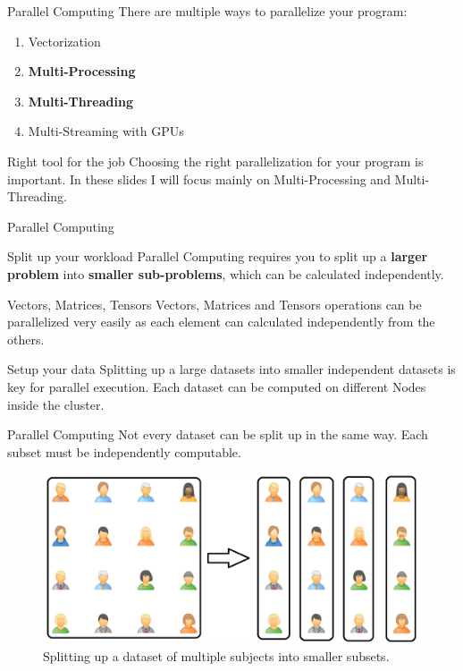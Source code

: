 \documentclass{beamer}
\begin{document}
\begin{frame}{Parallel Computing}
	There are multiple ways to parallelize your program:	
	\begin{enumerate}
		\item Vectorization
		\item \textbf{Multi-Processing}
		\item \textbf{Multi-Threading}
		\item Multi-Streaming with GPUs
	\end{enumerate}
	\begin{block}{Right tool for the job}
			Choosing the right parallelization for your program is important.  In these slides I will focus mainly on Multi-Processing and Multi-Threading.
	\end{block}

\end{frame}
\begin{frame}{Parallel Computing}
	\begin{block}{Split up your workload}
	Parallel Computing requires you to split up a \textbf{larger problem} into \textbf{smaller sub-problems}, which can be calculated independently.
	\end{block}

	
	\begin{block}{Vectors, Matrices, Tensors}
		Vectors, Matrices and Tensors operations can be parallelized very easily as each element can calculated independently from the others.
	\end{block}
	\begin{block}{Setup your data}
	Splitting up a large datasets into smaller independent datasets is key for parallel execution. Each dataset can be computed on different Nodes inside the cluster.
	\end{block}

\end{frame}

\begin{frame}{Parallel Computing}
Not every dataset can be split up in the same way. Each subset must be independently computable.
		\begin{figure}
		\centering
		\includegraphics[width=\textwidth]{split_up.png}
		\caption{Splitting up a dataset of multiple subjects into smaller subsets.}
	\end{figure}
\end{frame}
\end{document}
